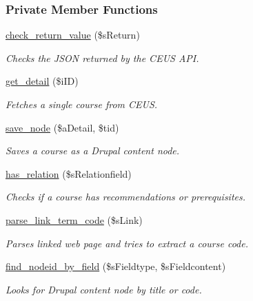 \subsubsection*{Private Member Functions}
\begin{DoxyCompactItemize}
\item 
\hyperlink{classceus__importer_a9147e757eb1c4c80e2720b160b86c239}{check\+\_\+return\+\_\+value} (\$s\+Return)
\begin{DoxyCompactList}\small\item\em Checks the J\+S\+O\+N returned by the C\+E\+U\+S A\+P\+I. \end{DoxyCompactList}\item 
\hyperlink{classceus__importer_a1b7d86575274b687d8e2fa9b29d7f7ba}{get\+\_\+detail} (\$i\+I\+D)
\begin{DoxyCompactList}\small\item\em Fetches a single course from C\+E\+U\+S. \end{DoxyCompactList}\item 
\hyperlink{classceus__importer_ae963f27a37b0a77da7c6f6c936625d3c}{save\+\_\+node} (\$a\+Detail, \$tid)
\begin{DoxyCompactList}\small\item\em Saves a course as a Drupal content node. \end{DoxyCompactList}\item 
\hyperlink{classceus__importer_a689c3df400e042323dcfc8a70bb86c0e}{has\+\_\+relation} (\$s\+Relationfield)
\begin{DoxyCompactList}\small\item\em Checks if a course has recommendations or prerequisites. \end{DoxyCompactList}\item 
\hyperlink{classceus__importer_a49143005c3d0328fd8e982f2f035f9e0}{parse\+\_\+link\+\_\+term\+\_\+code} (\$s\+Link)
\begin{DoxyCompactList}\small\item\em Parses linked web page and tries to extract a course code. \end{DoxyCompactList}\item 
\hyperlink{classceus__importer_a9b4d3aec74218c3b3ea4fd6b2dabec17}{find\+\_\+nodeid\+\_\+by\+\_\+field} (\$s\+Fieldtype, \$s\+Fieldcontent)
\begin{DoxyCompactList}\small\item\em Looks for Drupal content node by title or code. \end{DoxyCompactList}\item 

\end{DoxyCompactItemize}
